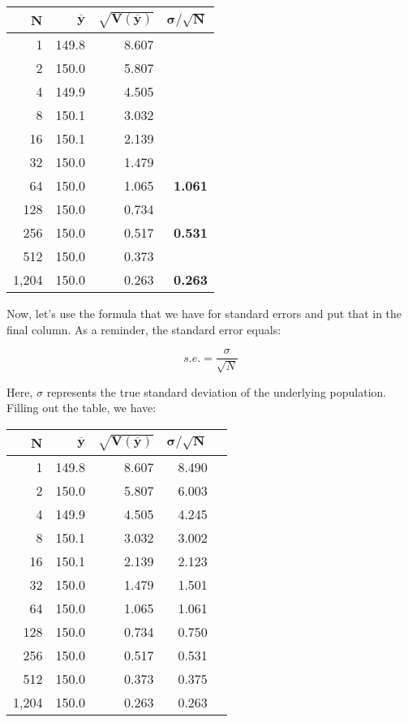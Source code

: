 \documentclass[11pt]{lecturenotes}
\begin{document}
\begin{table}[!h]
\begin{center}
\begin{tabular}{rrrr}
\textbf{N} & $\mathbf{\overline{y}}$ & $\mathbf{\sqrt{V(\overline{y})}}$ & $\mathbf{\sigma/\sqrt{N}}$ \\ \toprule
1 & 149.8 & 8.607 & \\
2 & 150.0 & 5.807 & \\
4 & 149.9 & 4.505 & \\
8 & 150.1 & 3.032 & \\
16 & 150.1 & 2.139 & \\
32 & 150.0 & 1.479 & \\
64 & 150.0 & 1.065 & \textbf{1.061}\\
128 & 150.0 & 0.734 & \\
256 & 150.0 & 0.517 & \textbf{0.531} \\
512 & 150.0 & 0.373 & \\
1,204 & 150.0 & 0.263 & \textbf{0.263} \\ \bottomrule
\end{tabular}
\end{center}
\end{table}

Now, let's use the formula that we have for standard errors and put that in the final column. As a reminder, the standard error equals: 

\[ s.e. = \frac{\sigma}{\sqrt{N}} \]

Here, $\sigma$ represents the true standard deviation of the underlying population. Filling out the table, we have: 

\begin{table}[!h]
\begin{center}
\begin{tabular}{rrrrr}
\textbf{N} & $\mathbf{\overline{y}}$ & $\mathbf{\sqrt{V(\overline{y})}}$ & $\mathbf{\sigma/\sqrt{N}}$ \\ \toprule
1 & 149.8 & 8.607 & 8.490 \\
2 & 150.0 & 5.807 & 6.003 \\
4 & 149.9 & 4.505 & 4.245 \\
8 & 150.1 & 3.032 & 3.002 \\
16 & 150.1 & 2.139 & 2.123 \\
32 & 150.0 & 1.479 & 1.501 \\
64 & 150.0 & 1.065 & 1.061\\
128 & 150.0 & 0.734 & 0.750 \\
256 & 150.0 & 0.517 & 0.531 \\
512 & 150.0 & 0.373 & 0.375 \\
1,204 & 150.0 & 0.263 & 0.263 \\ \bottomrule
\end{tabular}
\end{center}
\end{table}
\end{document}
